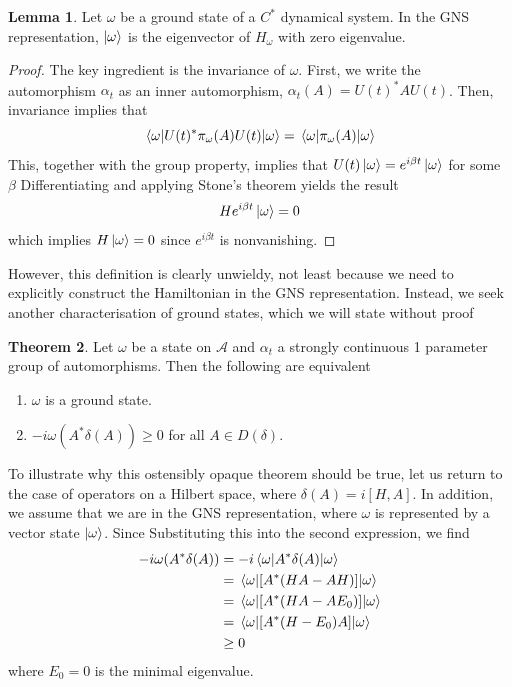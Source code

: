\documentclass[prb,11pt, nofootinbib]{revtex4-2}
\theoremstyle{definition}
\newtheorem{Theorem}{Theorem}
\newtheorem{Lemma}[Theorem]{Lemma}
\theoremstyle{definition}
\theoremstyle{definition}
\theoremstyle{definition}
\begin{document}
\begin{Lemma}
	Let $\omega$ be a ground state of a $C^*$ dynamical system. In the GNS representation, $\ket{\omega}$ is the eigenvector of $H_\omega$ with zero eigenvalue.
\end{Lemma}
\begin{proof}
	The key ingredient is the invariance of $\omega$. First, we write the automorphism $\alpha_t$ as an inner automorphism, $\alpha_t(A) = U(t)^*AU(t)$. Then, invariance implies that
	\[\mel{\omega}{U(t)^*\pi_\omega(A)U(t)}{\omega}=\mel{\omega}{\pi_\omega(A)}{\omega}\]
	This, together with the group property, implies that $U(t)\ket{\omega}=e^{i\beta t}\ket{\omega}$ for some $\beta$ Differentiating and applying Stone's theorem yields the result 
	\[He^{i\beta t}\ket{\omega} =0\]
	which implies $H\ket{\omega}=0$ since $e^{i\beta t}$ is nonvanishing.
\end{proof}

However, this definition is clearly unwieldy, not least because we need to explicitly construct the Hamiltonian in the GNS representation. Instead, we seek another characterisation of ground states, which we will state without proof
\begin{Theorem}
	\label{thm:groundstate}
	Let $\omega$ be a state on $\mathcal{A}$ and $\alpha_t$ a strongly continuous 1 parameter group of automorphisms. Then the following are equivalent
	\begin{enumerate}
		\item $\omega$ is a ground state.
		\item $-i\omega(A^*\delta(A))\ge 0$ for all $A\in D(\delta)$.
	\end{enumerate}
\end{Theorem}
To illustrate why this ostensibly opaque theorem should be true, let us return to the case of operators on a Hilbert space, where $\delta(A)=i[H,A]$. In addition, we assume that we are in the GNS representation, where $\omega$ is represented by a vector state $\ket{\omega}$. Since Substituting this into the second expression, we find
\begin{align*}
-i\omega(A^*\delta(A)) &= -i \mel{\omega}{A^*\delta(A)}{\omega}\\
&= \mel{\omega}{\left[A^*(HA - AH)\right]}{\omega}\\
&= \mel{\omega}{\left[A^*(HA - AE_0)\right]}{\omega}\\
&= \mel{\omega}{\left[A^*(H-E_0)A\right]}{\omega}\\
&\ge 0
\end{align*}
where $E_0=0$ is the minimal eigenvalue.
\end{document}
